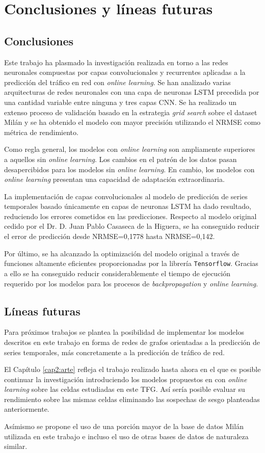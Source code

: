\chapter{Conclusiones y líneas futuras}
\label{cap9:conclusiones}
\section{Conclusiones}
Este trabajo ha plasmado la investigación realizada en torno a las redes neuronales compuestas por capas convolucionales y recurrentes aplicadas a la predicción del tráfico en red con \textit{online learning}. Se han analizado varias arquitecturas de redes neuronales con una capa de neuronas LSTM precedida por una cantidad variable entre ninguna y tres capas CNN. Se ha realizado un extenso proceso de validación basado en la estrategia \textit{grid search} sobre el dataset Milán y se ha obtenido el modelo con mayor precisión utilizando el NRMSE como métrica de rendimiento.

Como regla general, los modelos con \textit{online learning} son ampliamente superiores a aquellos sin \textit{online learning}. Los cambios en el patrón de los datos pasan desapercibidos para los modelos sin \textit{online learning}. En cambio, los modelos con \textit{online learning} presentan una capacidad de adaptación extraordinaria.

La implementación de capas convolucionales al modelo de predicción de series temporales basado únicamente en capas de neuronas LSTM ha dado resultado, reduciendo los errores cometidos en las predicciones. Respecto al modelo original cedido por el Dr. D. Juan Pablo Casaseca de la Higuera, se ha conseguido reducir el error de predicción desde NRMSE=0,1778 hasta NRMSE=0,142.

Por último, se ha alcanzado la optimización del modelo original a través de funciones altamente eficientes proporcionadas por la librería \texttt{Tensorflow}. Gracias a ello se ha conseguido reducir considerablemente el tiempo de ejecución requerido por los modelos para los procesos de \textit{backpropagation} y \textit{online learning}.


\section{Líneas futuras}
Para próximos trabajos se plantea la posibilidad de implementar los modelos descritos en este trabajo en forma de redes de grafos orientadas a la predicción de series temporales, más concretamente a la predicción de tráfico de red.

El Capítulo \ref{cap2:arte} refleja el trabajo realizado hasta ahora en el que es posible continuar la investigación introduciendo los modelos propuestos en \cite{tfgalicia} con \textit{online learning} sobre las celdas estudiadas en este TFG. Así sería posible evaluar su rendimiento sobre las mismas celdas eliminando las sospechas de sesgo planteadas anteriormente.

Asímismo se propone el uso de una porción mayor de la base de datos Milán utilizada en este trabajo e incluso el uso de otras bases de datos de naturaleza similar.